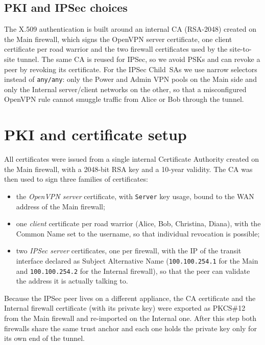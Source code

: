 \documentclass[twocolumn]{NobArticle}
\begin{document}
\subsection{PKI and IPSec choices}

The X.509 authentication is built around an internal CA (RSA-2048)
created on the Main firewall, which signs the OpenVPN server certificate,
one client certificate per road warrior and the two firewall certificates
used by the site-to-site tunnel. The same CA is reused for IPSec, so we
avoid PSKs and can revoke a peer by revoking its certificate. For the
IPSec Child~SAs we use narrow selectors instead of \texttt{any/any}: only
the Power and Admin VPN pools on the Main side and only the Internal
server/client networks on the other, so that a misconfigured OpenVPN
rule cannot smuggle traffic from Alice or Bob through the tunnel.

\section{PKI and certificate setup}
\label{sec:pki}

All certificates were issued from a single internal Certificate Authority
created on the Main firewall, with a 2048-bit RSA key and a 10-year
validity. The CA was then used to sign three families of certificates:

\begin{itemize}
    \item the \textit{OpenVPN server} certificate, with \texttt{Server}
    key usage, bound to the WAN address of the Main firewall;
    \item one \textit{client} certificate per road warrior (Alice, Bob,
    Christina, Diana), with the Common Name set to the username, so that
    individual revocation is possible;
    \item two \textit{IPSec server} certificates, one per firewall, with
    the IP of the transit interface declared as Subject Alternative Name
    (\texttt{100.100.254.1} for the Main and \texttt{100.100.254.2} for
    the Internal firewall), so that the peer can validate the address it
    is actually talking to.
\end{itemize}

Because the IPSec peer lives on a different appliance, the CA certificate
and the Internal firewall certificate (with its private key) were
exported as PKCS\#12 from the Main firewall and re-imported on the
Internal one. After this step both firewalls share the same trust anchor
and each one holds the private key only for its own end of the tunnel.
\end{document}
